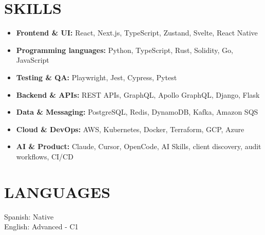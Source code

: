 \documentclass{article}
\begin{document}
\section*{SKILLS}
\begin{itemize}
	\item \textbf{Frontend \& UI:} React, Next.js, TypeScript, Zustand, Svelte, React Native
	\item \textbf{Programming languages:} Python, TypeScript, Rust, Solidity, Go, JavaScript
	\item \textbf{Testing \& QA:} Playwright, Jest, Cypress, Pytest
	\item \textbf{Backend \& APIs:} REST APIs, GraphQL, Apollo GraphQL, Django, Flask
	\item \textbf{Data \& Messaging:} PostgreSQL, Redis, DynamoDB, Kafka, Amazon SQS
	\item \textbf{Cloud \& DevOps:} AWS, Kubernetes, Docker, Terraform, GCP, Azure
	\item \textbf{AI \& Product:} Claude, Cursor, OpenCode, AI Skills, client discovery, audit workflows, CI/CD
\end{itemize}

\section*{LANGUAGES}
Spanish: Native\\
English: Advanced {-} C1
\end{document}
